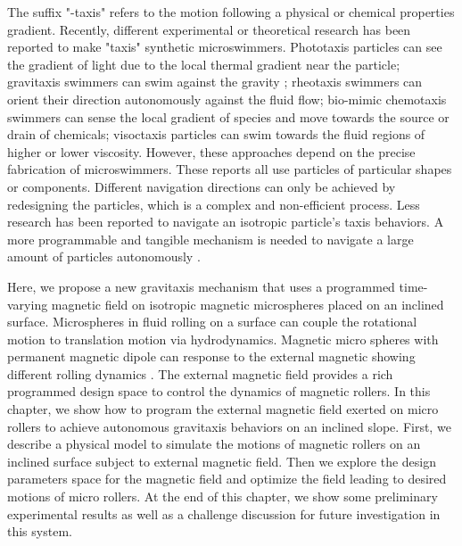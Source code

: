 The suffix "-taxis" refers to the motion following a physical or chemical properties gradient. Recently, different experimental or theoretical research has been reported to make "taxis" synthetic microswimmers. Phototaxis particles can see the gradient of light due to the local thermal gradient near the particle\autocite{yu2019phototaxis,dai2016programmable,lozano2016phototaxis,chen2017light}; gravitaxis swimmers can swim against the gravity \autocite{campbell2013gravitaxis,ten2014gravitaxis}; rheotaxis swimmers can orient their direction autonomously against the fluid flow\autocite{Palacci2015,ren2017rheotaxis,brosseau2019relating}; bio-mimic chemotaxis swimmers can sense the local gradient of species and move towards the source or drain of chemicals\autocite{dou2019autonomous}; visoctaxis particles can swim towards the fluid regions of higher or lower viscosity\autocite{liebchen2018viscotaxis}. However, these approaches depend on the precise fabrication of microswimmers.
These reports all use particles of particular shapes or components. Different navigation directions can only be achieved by redesigning the particles, which is a complex and non-efficient process. Less research has been reported to navigate an isotropic particle's taxis behaviors. A more programmable and tangible mechanism is needed to navigate a large amount of particles autonomously \autocite{dou2019autonomous}.

Here, we propose a new gravitaxis mechanism that uses a programmed time-varying magnetic field on isotropic magnetic microspheres placed on an inclined surface. Microspheres in fluid rolling on a surface can couple the rotational motion to translation motion via hydrodynamics\autocite{galvin2001time,rashidi2016theoretical}. Magnetic micro spheres with permanent magnetic dipole  can response to the external  magnetic showing different rolling dynamics \autocite{helgesen2019propulsion,helgesen2018magnetic}.
The external magnetic field provides a rich programmed design space to control the dynamics of magnetic rollers.
In this chapter, we show how to program the external magnetic field exerted on  micro rollers to achieve autonomous gravitaxis behaviors on an inclined slope. First, we describe a physical model to simulate the motions of magnetic rollers on an inclined surface subject to external magnetic field. Then we explore the design parameters space for the magnetic field  and optimize the field leading to desired motions of  micro rollers. At the end of this chapter, we show some preliminary experimental results as well as a challenge discussion for future investigation in this system. 

